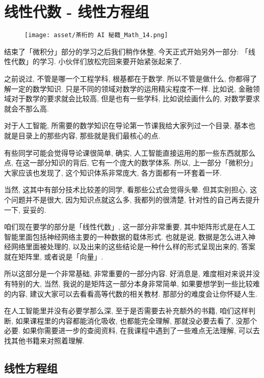 \chapter{线性代数 - 线性方程组}

\begin{figure}[ht]
  \centering
  \texttt{[image: asset/茶桁的 AI 秘籍\_Math\_14.png]}
\end{figure}

\newpage

结束了「微积分」部分的学习之后我们稍作休整, 今天正式开始另外一部分: 「线性代数」的学习. 小伙伴们放松完回来要开始紧张起来了. 

之前说过, 不管是哪一个工程学科, 根基都在于数学. 所以不管是做什么, 你都得了解一定的数学知识. 只是不同的领域对数学的运用精尖程度不一样. 比如说, 金融领域对于数学的要求就会比较高, 但是也有一些学科, 比如说绘画什么的, 对数学要求就会不那么高. 

对于人工智能, 所需要的数学知识在导论第一节课我给大家列过一个目录, 基本也就是目录上的那些内容, 那些就是我们最核心的点. 

有些同学可能会觉得导论课很简单, 确实, 人工智能直接运用的那一些东西就那么点, 在这一部分知识的背后, 它有一个庞大的数学体系. 所以, 上一部分「微积分」大家应该也发现了, 这个知识体系非常庞大, 各方面都有一环套着一环. 

当然, 这其中有部分技术比较差的同学, 看那些公式会觉得头晕. 但其实别担心, 这个问题并不是很大, 因为知识点就这么多, 我都列的很清楚, 针对性的自己再去提升一下, 妥妥的. 

咱们现在要学的部分是「线性代数」, 这一部分非常重要, 其中矩阵形式是在人工智能里面包括神经网络主要的一种数据的载体形式. 也就是说, 数据是怎么进入神经网络里面被处理的, 以及出来的这些结论是一种什么样的形式呈现出来的, 答案就在矩阵里, 或者说是「向量」. 

所以这部分是一个非常基础, 非常重要的一部分内容. 好消息是, 难度相对来说并没有特别的大, 当然, 我说的是矩阵这一部分本身非常简单, 如果要想学到一些比较难的内容, 建议大家可以去看看高等代数的相关教材. 那部分的难度会让你怀疑人生.

在人工智能里并没有必要学那么深, 至于是否需要去补充额外的书籍, 咱们这样判断, 如果课程里的内容都能消化吸收, 也都能完全理解, 那就没必要去看了, 没那个必要. 如果你需要进一步的查阅资料, 在我课程中遇到了一些难点无法理解, 可以去找其他书籍来对照着理解. 

\section{线性方程组}

